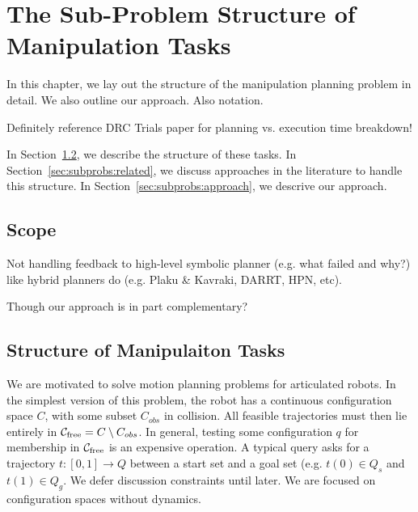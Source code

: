 \chapter{The Sub-Problem Structure of Manipulation Tasks}
\label{chap:formulation}

In this chapter,
we lay out the structure of the manipulation planning problem
in detail.
We also outline our approach.
Also notation.

Definitely reference DRC Trials paper for planning vs. execution
time breakdown!

In Section~\ref{sec:subprobs:structure},
we describe the structure of these tasks.
In Section~\ref{sec:subprobs:related},
we discuss approaches in the literature
to handle this structure.
In Section~\ref{sec:subprobs:approach},
we descrive our approach.

\section{Scope}

Not handling feedback to high-level symbolic planner
(e.g. what failed and why?)
like hybrid planners do
(e.g. Plaku \& Kavraki, DARRT, HPN, etc).

Though our approach is in part complementary?

\section{Structure of Manipulaiton Tasks}
\label{sec:subprobs:structure}

We are motivated to solve motion planning problems for articulated robots.
In the simplest version of this problem,
the robot has a continuous configuration space $C$,
with some subset $C_{obs}$ in collision.
All feasible trajectories must then lie entirely in
$\mathcal{C}_{\mbox{\scriptsize free}} = C \setminus C_{obs}$.
In general, testing some configuration $q$ for membership in
$\mathcal{C}_{\mbox{\scriptsize free}}$
is an expensive operation.
A typical query asks for a trajectory $t: [0,1] \rightarrow Q$ between
a start set and a goal set (e.g. $t(0) \in Q_s$ and $t(1) \in Q_g$.
We defer discussion constraints until later.
We are focused on configuration spaces without dynamics.

